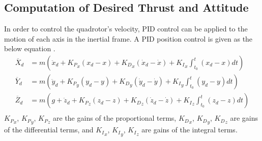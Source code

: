 \subsection{Computation of Desired Thrust and Attitude}

In order to control the quadrotor's velocity, PID control can be applied to the motion of each axis in the inertial frame. A PID position control is given as the below equation \cite{Morgan16}\cite{giri}.
\begin{equation}
\label{eq:original_pid}
\begin{aligned}
{\overline X}_d & = m \left( \ddot{x}_d + {{K_P}_x}({x_d} - { x} ) + {{K_D}_x}({\dot {x}_d} -\dot{ x} ) + {{K }_I}_x \int_{t_0}^{t}({{x_d} - { x} }) dt \right) \\
{\overline Y}_d & = m \left( \ddot{y}_d + {{K_P}_y}({y_d} - { y} ) + {{K_D}_y}({\dot {y}_d} -\dot{ y} ) + {{K }_I}_y \int_{t_0}^{t}({{y_d} - { y} }) dt \right) \\
{\overline Z}_d & = m \left( g + \ddot{z}_d  + {{K_P}_z}({z_d} - { z} ) + {{K_D}_z}({\dot {z}_d} -\dot{ z} ) + {{K }_I}_z \int_{t_0}^{t}({{z_d} - { z} }) dt \right)\\
\end{aligned}
\end{equation}
\({{K_{P}}_x}\), \({{K_{P}}_y}\), \({{K_{P}}_z}\) are the gains of the proportional terms, \({{K_{D}}_x}\), \({{K_{D}}_y}\), \({{K_{D}}_z}\) are gains of the differential terms, and \({{K_{I}}_x}\), \({{K_{I}}_y}\), \({{K_{I}}_z}\) are gains of the integral terms.

